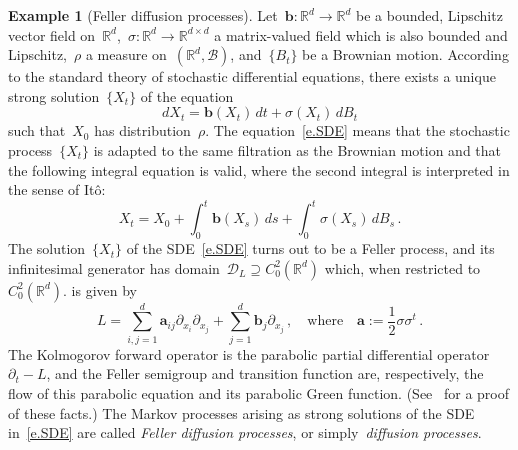 \documentclass[11pt,twoside]{article} %
\numberwithin{equation}{section}
\theoremstyle{definition}
\newtheorem{example}[theorem]{Example}
\newcommand*{\R}{\ensuremath{\mathbb{R}}}
\newcommand*{\Rd}{\ensuremath{\mathbb{R}^d}}
\renewcommand{\b}{\ensuremath{\mathbf{b}}}
\renewcommand{\a}{\mathbf{a}}
\begin{document}
\begin{example}[Feller diffusion processes]
Let~$\b: \Rd \to \Rd$ be a bounded, Lipschitz vector field on~$\Rd$,~$\sigma:\Rd \to \R^{d\times d}$ a matrix-valued field which is also bounded and Lipschitz,~$\rho$ a measure on~$(\Rd,\mathscr{B})$, and~$\{B_t\}$ be a Brownian motion. 
According to the standard theory of stochastic differential equations, 
there exists a unique strong solution~$\{X_t\}$ of the equation
\begin{equation}
\label{e.SDE}
dX_t = \b(X_t) \, dt + \sigma(X_t) \, dB_t
\end{equation}
such that~$X_0$ has distribution~$\rho$. 
The equation~\eqref{e.SDE} means that the stochastic process~$\{ X_t\}$ is adapted to the same filtration as the Brownian motion and that the following integral equation is valid, where the second integral is interpreted in the sense of It\^o:
\begin{equation}
\label{e.SDE.Ito}
X_t = X_0 + \int_0^t \b(X_s) \, ds + \int_0^t \sigma(X_s) \, dB_s\,. 
\end{equation}
The solution~$\{ X_t\}$ of the SDE~\eqref{e.SDE} turns out to be a Feller process, and its infinitesimal generator has domain~$\mathscr{D}_L \supseteq C^2_0(\Rd)$ which, when restricted to~$C^2_0(\Rd)$. is given by 
\begin{equation}
\label{e.L.nondivform}
L = 
\sum_{i,j=1}^d \a_{ij} \partial_{x_i} \partial_{x_j} 
+
\sum_{j=1}^d \b_j \partial_{x_j} 
\,, \quad \mbox{where} \quad \a := \frac12\sigma\sigma^t\,.
\end{equation}
The Kolmogorov forward operator is the parabolic partial differential operator~$\partial_t - L$, and the Feller semigroup and transition function are, respectively, the flow of this parabolic equation and its parabolic Green function. (See~\cite[IX.2]{RY} for a proof of these facts.)
The Markov processes arising as strong solutions of the SDE in~\eqref{e.SDE} are called \emph{Feller diffusion processes}, or simply~\emph{diffusion processes}. 
\end{example}
\end{document}
